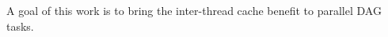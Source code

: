  A goal of this work is to bring the inter-thread cache benefit \addcite to parallel DAG tasks. 





